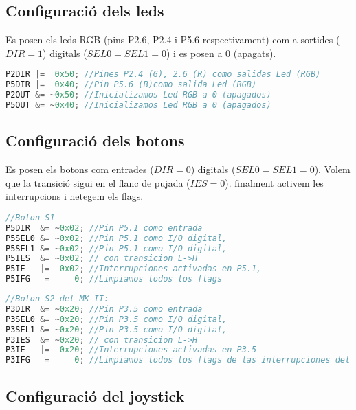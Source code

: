 \documentclass[12pt,a4paper]{article}
\begin{document}
\subsection{Configuració dels leds}
Es posen els leds RGB (pins P2.6, P2.4 i P5.6 respectivament) com a sortides ($DIR = 1$) digitals ($SEL0 = SEL1 = 0$) i es posen a 0 (apagats).

\begin{lstlisting}[language=C++]
P2DIR |=  0x50; //Pines P2.4 (G), 2.6 (R) como salidas Led (RGB)
P5DIR |=  0x40; //Pin P5.6 (B)como salida Led (RGB)
P2OUT &= ~0x50; //Inicializamos Led RGB a 0 (apagados)
P5OUT &= ~0x40; //Inicializamos Led RGB a 0 (apagados)
\end{lstlisting}

\subsection{Configuració dels botons}

Es posen els botons com entrades ($DIR = 0$) digitals ($SEL0 = SEL1 = 0$). Volem que la transició sigui en el flanc de pujada ($IES = 0$). finalment activem les interrupcions i netegem els flags.

\begin{lstlisting}[language=C++]
//Boton S1
P5DIR  &= ~0x02; //Pin P5.1 como entrada
P5SEL0 &= ~0x02; //Pin P5.1 como I/O digital,
P5SEL1 &= ~0x02; //Pin P5.1 como I/O digital,
P5IES  &= ~0x02; // con transicion L->H
P5IE   |=  0x02; //Interrupciones activadas en P5.1,
P5IFG   =     0; //Limpiamos todos los flags
\end{lstlisting}

\begin{lstlisting}[language=C++]
//Boton S2 del MK II:
P3DIR  &= ~0x20; //Pin P3.5 como entrada
P3SEL0 &= ~0x20; //Pin P3.5 como I/O digital,
P3SEL1 &= ~0x20; //Pin P3.5 como I/O digital,
P3IES  &= ~0x20; // con transicion L->H
P3IE   |=  0x20; //Interrupciones activadas en P3.5
P3IFG   =     0; //Limpiamos todos los flags de las interrupciones del puerto 3
\end{lstlisting}

\subsection{Configuració del joystick}
\end{document}
